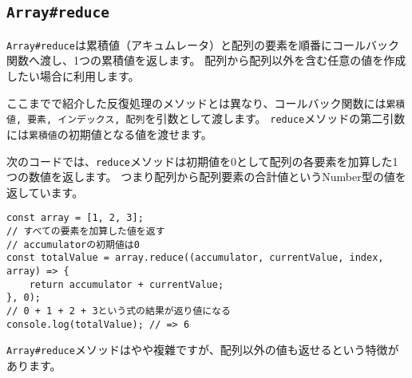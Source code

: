 \hypertarget{array-reduce}{%
\subsection{\texorpdfstring{\texttt{Array\#reduce}}{Array\#reduce}}\label{array-reduce}}

\texttt{Array\#reduce}は累積値（アキュムレータ）と配列の要素を順番にコールバック関数へ渡し、1つの累積値を返します。
配列から配列以外を含む任意の値を作成したい場合に利用します。

ここまでで紹介した反復処理のメソッドとは異なり、コールバック関数には\texttt{累積値, 要素, インデックス, 配列}を引数として渡します。
\texttt{reduce}メソッドの第二引数には\texttt{累積値}の初期値となる値を渡せます。

次のコードでは、\texttt{reduce}メソッドは初期値を0として配列の各要素を加算した1つの数値を返します。
つまり配列から配列要素の合計値というNumber型の値を返しています。

\begin{lstlisting}
const array = [1, 2, 3];
// すべての要素を加算した値を返す
// accumulatorの初期値は0
const totalValue = array.reduce((accumulator, currentValue, index, array) => {
    return accumulator + currentValue;
}, 0);
// 0 + 1 + 2 + 3という式の結果が返り値になる
console.log(totalValue); // => 6
\end{lstlisting}

\texttt{Array\#reduce}メソッドはやや複雜ですが、配列以外の値も返せるという特徴があります。

